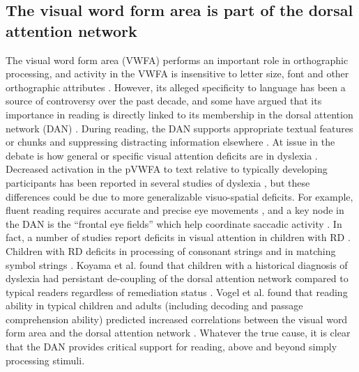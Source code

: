 \subsection{The visual word form area is part of the dorsal attention network} 
The visual word form area (VWFA) performs an important role in orthographic processing, and activity in the VWFA is insensitive to letter size, font and other orthographic attributes \citep{Cohen2002}. However, its alleged specificity to language has been a source of controversy over the past decade, and some have argued that its importance in reading is directly linked to its membership in the dorsal attention network (DAN) \citep{Vogel2012a}. During reading, the DAN supports appropriate textual features or chunks and suppressing distracting information elsewhere \citep{Corbetta2002}. At issue in the debate is how general or specific visual attention deficits are in dyslexia \citep{Vogel2014}. Decreased activation in the pVWFA to text relative to typically developing participants has been reported in several studies of dyslexia \citep{Richlan2009}, but these differences could be due to more generalizable visuo-spatial deficits. For example, fluent reading requires accurate and precise eye movements \citep{Rayner1998}, and a key node in the DAN is the ``frontal eye fields'' which help coordinate saccadic activity \citep{Connolly2002}. In fact, a number of studies report deficits in visual attention in children with RD \citep{Vidyasagar2010}. Children with RD deficits in processing of consonant strings and in matching symbol strings \citep{Pammer2004}. Koyama et al.  found that children with a historical diagnosis of dyslexia had persistant de-coupling of the dorsal attention network compared to typical readers regardless of remediation status \citep{Koyama2013}. Vogel et al.  found that reading ability in typical children and adults (including decoding and passage comprehension ability) predicted increased correlations between the visual word form area and the dorsal attention network \citep{Vogel2012a}. Whatever the true cause, it is clear that the DAN provides critical support for reading, above and beyond simply processing stimuli.

